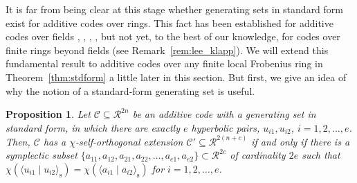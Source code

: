 \documentclass{article}
\newtheorem{prop}{Proposition}[section]
\theoremstyle{remark}
\theoremstyle{definition}
\numberwithin{equation}{section}
\begin{document}
It is far from being clear at this stage whether generating sets in standard form exist for additive codes over rings. This fact has been established for additive codes over fields \cite{brun}, \cite{EAQECC_bookchapter}, \cite{galindo}, \cite{luo}, \cite{nadkarni} but not yet, to the best of our knowledge, for codes over finite rings beyond fields (see Remark~\ref{rem:lee_klapp}). We will extend this fundamental result to additive codes over any finite local Frobenius ring in Theorem~\ref{thm:stdform} a little later in this section. But first, we give an idea of why the notion of a standard-form generating set is useful.

 \begin{prop} \label{prop:ext}
 Let $\mathcal{C} \subseteq \mathcal{R}^{2n}$ be an additive code with a generating set in standard form, in which there are exactly $e$ hyperbolic pairs, $u_{i1},u_{i2}$, $i = 1,2,\ldots,e$. Then, $\mathcal{C}$ has a $\chi$-self-orthogonal extension $\mathcal{C}'  \subseteq \mathcal{R}^{2(n+c)}$ if and only if there is a symplectic subset $\{a_{11},a_{12},a_{21},a_{22},\ldots,a_{e1},a_{e2}\} \subset \mathcal{R}^{2c}$ of cardinality $2e$ such that $\chi(\langle u_{i1} \mid u_{i2} \rangle_{\mathrm{s}}) = \chi(\langle a_{i1} \mid a_{i2} \rangle_{\mathrm{s}})$ for $i=1,2,\ldots,e$.
 \end{prop}
\end{document}
